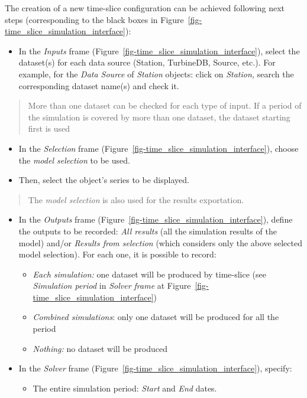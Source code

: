 \documentclass[
  letterpaper,
  DIV=11,
  numbers=noendperiod]{scrreprt}
\providecommand{\tightlist}{%
  \setlength{\itemsep}{0pt}\setlength{\parskip}{0pt}}\usepackage{longtable,booktabs,array}
\begin{document}
The creation of a new time-slice configuration can be achieved following
next steps (corresponding to the black boxes in
Figure~\ref{fig-time_slice_simulation_interface}):

\begin{itemize}
\tightlist
\item
  {In the \emph{Inputs} frame
  (Figure~\ref{fig-time_slice_simulation_interface}), select the
  dataset(s) for each data source (Station, TurbineDB, Source, etc.).
  For example, for the \emph{Data Source} of \emph{Station} objects:
  click on \emph{Station,} search the corresponding dataset name(s) and
  check it.}
\end{itemize}

\begin{quote}
More than one dataset can be checked for each type of input. If a period
of the simulation is covered by more than one dataset, the dataset
starting first is used
\end{quote}

\begin{itemize}
\item
  {In the \emph{Selection} frame
  (Figure~\ref{fig-time_slice_simulation_interface}), choose the
  \emph{model selection} to be used.}
\item
  {Then, select the object's series to be displayed.}
\end{itemize}

\begin{quote}
The \emph{model selection} is also used for the results exportation.
\end{quote}

\begin{itemize}
\item
  {In the \emph{Outputs} frame
  (Figure~\ref{fig-time_slice_simulation_interface}), define the outputs
  to be recorded: \emph{All results} (all the simulation results of the
  model) and/or \emph{Results from selection} (which considers only the
  above selected model selection). For each one, it is possible to
  record:}

  \begin{itemize}
  \item
    {\emph{Each simulation:} one dataset will be produced by time-slice
    (see \emph{Simulation period} in \emph{Solver frame} at
    Figure~\ref{fig-time_slice_simulation_interface})}
  \item
    {\emph{Combined simulations}: only one dataset will be produced for
    all the period}
  \item
    {\emph{Nothing:} no dataset will be produced}
  \end{itemize}
\item
  {In the \emph{Solver} frame
  (Figure~\ref{fig-time_slice_simulation_interface}), specify:}

  \begin{itemize}
  \tightlist
  \item
    {The entire simulation period: \emph{Start} and \emph{End} dates.}
  \end{itemize}
\end{itemize}
\end{document}
